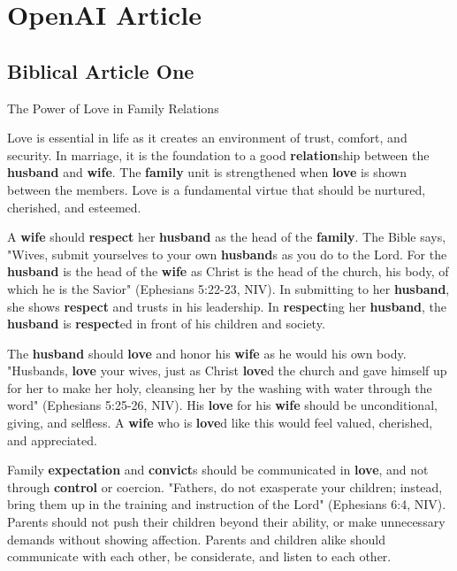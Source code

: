 \documentclass{article}
\begin{document}
\section{OpenAI Article}

\subsection{Biblical Article One}
The Power of Love in Family Relations

Love is essential in life as it creates an environment of trust, comfort, and security. In marriage, it is the foundation to a good \textbf{\textbf{relation}}ship between the \textbf{\textbf{husband}} and \textbf{\textbf{wife}}. The \textbf{\textbf{family}} unit is strengthened when \textbf{\textbf{love}} is shown between the members. Love is a fundamental virtue that should be nurtured, cherished, and esteemed.

A \textbf{\textbf{wife}} should \textbf{\textbf{respect}} her \textbf{\textbf{husband}} as the head of the \textbf{\textbf{family}}. The Bible says, "Wives, submit yourselves to your own \textbf{\textbf{husband}}s as you do to the Lord. For the \textbf{\textbf{husband}} is the head of the \textbf{\textbf{wife}} as Christ is the head of the church, his body, of which he is the Savior" (Ephesians 5:22-23, NIV). In submitting to her \textbf{\textbf{husband}}, she shows \textbf{\textbf{respect}} and trusts in his leadership. In \textbf{\textbf{respect}}ing her \textbf{\textbf{husband}}, the \textbf{\textbf{husband}} is \textbf{\textbf{respect}}ed in front of his children and society. 

The \textbf{\textbf{husband}} should \textbf{\textbf{love}} and honor his \textbf{\textbf{wife}} as he would his own body. "Husbands, \textbf{\textbf{love}} your wives, just as Christ \textbf{\textbf{love}}d the church and gave himself up for her to make her holy, cleansing her by the washing with water through the word" (Ephesians 5:25-26, NIV). His \textbf{\textbf{love}} for his \textbf{\textbf{wife}} should be unconditional, giving, and selfless. A \textbf{\textbf{wife}} who is \textbf{\textbf{love}}d like this would feel valued, cherished, and appreciated.

Family \textbf{\textbf{expectation}} and \textbf{\textbf{convict}}s should be communicated in \textbf{\textbf{love}}, and not through \textbf{\textbf{control}} or coercion. "Fathers, do not exasperate your children; instead, bring them up in the training and instruction of the Lord" (Ephesians 6:4, NIV). Parents should not push their children beyond their ability, or make unnecessary demands without showing affection. Parents and children alike should communicate with each other, be considerate, and listen to each other.
\end{document}
